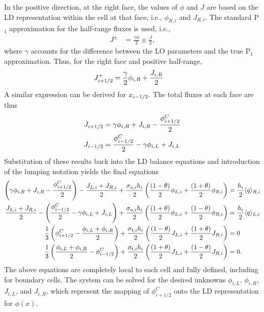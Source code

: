 In the positive direction, at the right face, the
values of $\phi$ and $J$ are based on the LD representation within the cell at that
face, i.e., $\phi_{R,i}$ and $J_{R,i}$.  The standard P$_1$ approximation for the
half-range fluxes is used\cite{stacy}, i.e.,
\begin{align}
    J^{\pm} &= \frac{\gamma \phi}{2} \pm \frac{J}{2},
\end{align}
where $\gamma$ accounts for the difference between the LO parameters and the true
P$_1$ approximation. Thus, for the right face and positive half-range,
\begin{align}
    J_{{i+1/2}}^+ &= \frac{\gamma}{2}\phi_{i,R} + \frac{J_{i,R}}{2} 
\end{align}
A similar expression can be derived for ${x_{i-1/2}}$.  The total fluxes at each face are
thus
\begin{align}
    J_{i+1/2} &= \gamma\phi_{i,R} + J_{i,R} - \frac{\phi_{{i+1/2}}^C}{2} \\
    J_{i-1/2} &= \frac{\phi_{i-1/2}^C}{2} - \gamma \phi_{i,L} + J_{i,L}
\end{align}
Substitution of these results back into the LD balance equations and introduction of the
lumping notation yields the final equations 
\begin{align}
    \left(\gamma\phi_{i,R} + J_{i,R} - \frac{\phi_{{i+1/2}}^C}{2} \right) - \frac{J_{L,i} + J_{R,i}}{2} + \frac{\sigma_{a,i} h_i}{2} \left(
    \frac{(1-\theta)}{2} \phi_{L,i} +
    \frac{(1+\theta)}{2}\phi_{R,i}\right) &= \frac{h_i}{2} \langle q \rangle_{R,i} \\
    \frac{J_{L,i} + J_{R,i}}{2} -\left(\frac{\phi_{i-1/2}^C}{2} - \gamma \phi_{i,L} +
    J_{i,L}\right) + \frac{\sigma_{a,i} h_i}{2} \left(
    \frac{(1+\theta)}{2} \phi_{L,i} +
    \frac{(1-\theta)}{2}\phi_{R,i}\right) &= \frac{h_i}{2} \langle q \rangle_{L,i} 
    \\
    \frac{1}{3}\left(\phi_{i+1/2}^C - \frac{\phi_{i,L} + \phi_{i,R}}{2}\right) +
    \frac{\sigma_{t,i} h_i}{2}\left( \frac{(1-\theta)}{2} J_{L,i} +
    \frac{(1+\theta)}{2}J_{R,i}\right)    &= 0 \\
    \frac{1}{3}\left(\frac{\phi_{i,L} + \phi_{i,R}}{2} - \phi^C_{i-1/2} \right) +
    \frac{\sigma_{t,i} h_i}{2} \left( \frac{(1+\theta)}{2} J_{L,i} +
    \frac{(1-\theta)}{2}J_{R,i}\right) &= 0 .
\end{align}
The above equations are completely local to each cell and fully defined, including for
boundary cells.  The system can be solved for the desired unknowns
$\phi_{i,L}$, $\phi_{i,R}$, $J_{i,L}$, and $J_{i,R}$, which represent the mapping of
$\phi_{i+1/2}^C$ onto the LD representation for $\phi(x)$.


